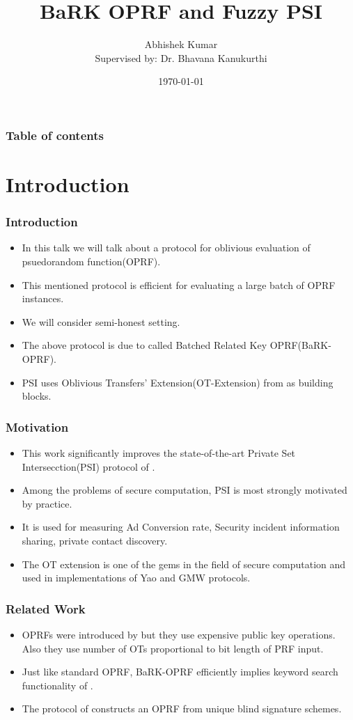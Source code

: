 \documentclass[hyperref={pdfpagelabels=false}]{beamer}
\title{BaRK OPRF and Fuzzy PSI}
\author[Abhishek Kumar]{Abhishek Kumar\\{\small Supervised by: Dr. Bhavana Kanukurthi}}
\date{\today}
\theoremstyle{remark}
\begin{document}
\begin{frame}
\titlepage
\end{frame} 


\begin{frame}
\frametitle{Table of contents}
\tableofcontents
\end{frame} 


\section{Introduction} 
\begin{frame}
\frametitle{Introduction} 
\begin{itemize}
\item In this talk we will talk about a protocol for oblivious evaluation of psuedorandom function(OPRF). \pause
\item This mentioned protocol is efficient for evaluating a large batch of OPRF instances. \pause
\item We will consider semi-honest setting.\pause
\item The above protocol is due to \cite{KKRT} called Batched Related Key OPRF(BaRK-OPRF).\pause
\item PSI uses Oblivious Transfers' Extension(OT-Extension) from \cite{KK} as building blocks.
\end{itemize}
\end{frame}

\begin{frame}
\frametitle{Motivation}
\begin{itemize}
\item This work significantly improves the state-of-the-art Private Set Intersecction(PSI) protocol of \cite{PSSZ}.\pause
\item Among the problems of secure computation, PSI is most strongly motivated by practice. \pause
\item It is used for measuring Ad Conversion rate, Security incident information sharing, private contact discovery.\pause
\item The \cite{IKNP} OT extension is one of the gems in the field of secure computation and used in implementations of Yao and GMW protocols.
\end{itemize}
 
\end{frame}

\begin{frame}
\frametitle{Related Work}
\begin{itemize}
\item OPRFs were introduced by \cite{FIPR} but they use expensive public key operations. Also they use number of OTs proportional to bit length of PRF input. \pause
\item Just like standard OPRF, BaRK-OPRF efficiently implies keyword search functionality of \cite{FIPR}. \pause
\item The protocol of \cite{CNS} constructs an OPRF from unique blind signature schemes.
\end{itemize}
\end{frame}
\end{document}
